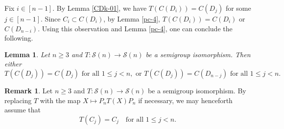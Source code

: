 \documentclass[11pt,reqno]{amsart}
\theoremstyle{plain}
\newtheorem{lemma}[theorem]{Lemma}
\theoremstyle{definition}
\newtheorem{rem}[theorem]{Remark}
\numberwithin{equation}{section}
\def\cS{\mathcal S}
\begin{document}
Fix $i\in [n-1]$. By Lemma \ref{CDk-01},  we have  $T(C(D_i))=C(D_j)$ for some $j\in [n-1]$. Since $C_i\subset C(D_i)$, by Lemma \ref{pc-4}, $T(C(D_i))=C(D_i)$ or $C(D_{n-i})$.  Using this observation and Lemma \ref{pc-4}, one can conclude the following.

\begin{lemma} \label{pc-4.1}
	Let $n \ge 3$ and  $T:\cS(n)\to \cS(n)$ be a semigroup isomorphism.  Then either
	\[ T(C(D_j)) = C(D_j) \text{ for all } 1 \le j < n, \text{ or } T(C(D_j))=  C(D_{n-j}) \text{ for all }1 \le j < n.\]
\end{lemma}

\begin{rem}\label{pcrem5.7}
Let $n \ge 3$ and  $T:\cS(n)\to \cS(n)$ be a semigroup isomorphism. By replacing $T$ with the map $X \mapsto P_n T(X) P_n$ if necessary, we may henceforth assume that
\begin{equation}\label{eqwlogn}
T(C_j)=C_j \quad \text{for all } 1 \le j < n.
\end{equation}
\end{rem}
\end{document}
